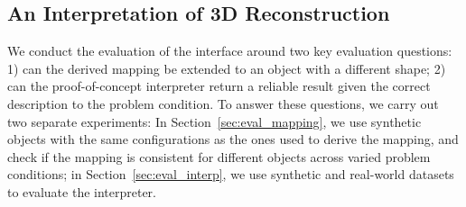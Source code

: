 \subsection{An Interpretation of 3D Reconstruction}
We conduct the evaluation of the interface around two key evaluation questions: 1) can the derived mapping be extended to an object with a different shape; 2) can the proof-of-concept interpreter return a reliable result given the correct description to the problem condition. To answer these questions, we carry out two separate experiments: In Section~\ref{sec:eval_mapping}, we use synthetic objects with the same configurations as the ones used to derive the mapping, and check if the mapping is consistent for different objects across varied problem conditions; in Section~\ref{sec:eval_interp}, we use synthetic and real-world datasets to evaluate the interpreter.



